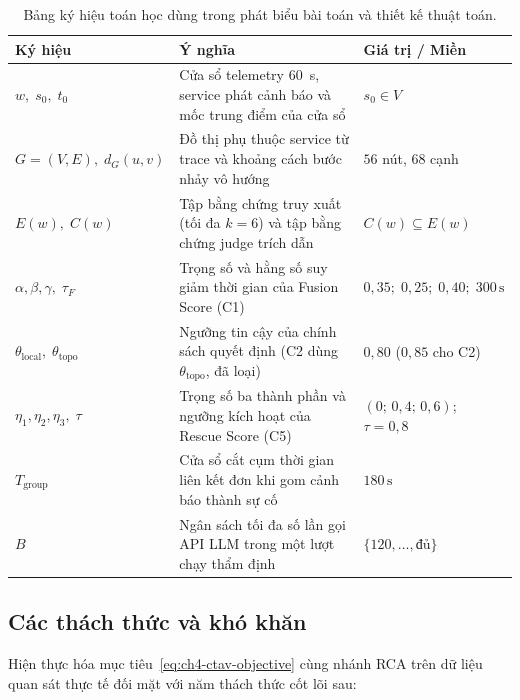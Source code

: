 \begin{table}[htbp]
  \centering
  \caption{Bảng ký hiệu toán học dùng trong phát biểu bài toán và thiết kế thuật toán.}
  \label{tab:ch4-ky-hieu}
  \footnotesize
  \begin{tabularx}{\linewidth}{@{}l Y l@{}}
    \toprule
    \textbf{Ký hiệu} & \textbf{Ý nghĩa} & \textbf{Giá trị / Miền} \\
    \midrule
    $w,\; s_0,\; t_0$ & Cửa sổ telemetry 60~s, service phát cảnh báo và mốc trung điểm của cửa sổ & $s_0 \in V$ \\
    $G = (V, E),\; d_G(u, v)$ & Đồ thị phụ thuộc service từ trace và khoảng cách bước nhảy vô hướng & $56$ nút, $68$ cạnh \\
    $E(w),\; C(w)$ & Tập bằng chứng truy xuất (tối đa $k = 6$) và tập bằng chứng judge trích dẫn & $C(w) \subseteq E(w)$ \\
    $\alpha, \beta, \gamma,\; \tau_F$ & Trọng số và hằng số suy giảm thời gian của Fusion Score (C1) & $0{,}35;\; 0{,}25;\; 0{,}40;\; 300\,\text{s}$ \\
    $\theta_{\text{local}},\; \theta_{\text{topo}}$ & Ngưỡng tin cậy của chính sách quyết định (C2 dùng $\theta_{\text{topo}}$, đã loại) & $0{,}80$ ($0{,}85$ cho C2) \\
    $\eta_1, \eta_2, \eta_3,\; \tau$ & Trọng số ba thành phần và ngưỡng kích hoạt của Rescue Score (C5) & $(0;\, 0{,}4;\, 0{,}6)$;\; $\tau = 0{,}8$ \\
    $T_{\text{group}}$ & Cửa sổ cắt cụm thời gian liên kết đơn khi gom cảnh báo thành sự cố & $180\,\text{s}$ \\
    $B$ & Ngân sách tối đa số lần gọi API LLM trong một lượt chạy thẩm định & $\{120, \dots, \text{đủ}\}$ \\
    \bottomrule
  \end{tabularx}
\end{table}

\subsection{Các thách thức và khó khăn}
\label{sec:ch4-thach-thuc}

Hiện thực hóa mục tiêu~\eqref{eq:ch4-ctav-objective} cùng nhánh RCA trên dữ liệu quan sát thực tế đối mặt với năm thách thức cốt lõi sau:

